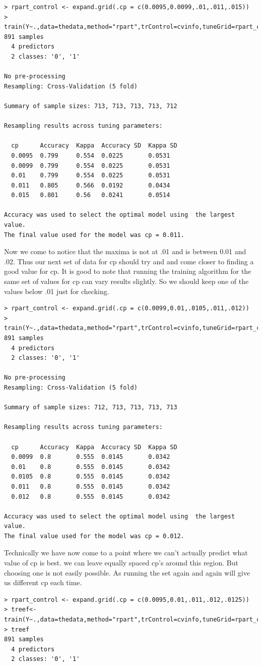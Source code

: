 \documentclass[fontsize=10pt]{scrartcl}
\begin{document}
\begin{enumerate}
\begin{verbatim}
> rpart_control <- expand.grid(.cp = c(0.0095,0.0099,.01,.011,.015)) 
> train(Y~.,data=thedata,method="rpart",trControl=cvinfo,tuneGrid=rpart_control)
891 samples
  4 predictors
  2 classes: '0', '1' 

No pre-processing
Resampling: Cross-Validation (5 fold) 

Summary of sample sizes: 713, 713, 713, 713, 712 

Resampling results across tuning parameters:

  cp      Accuracy  Kappa  Accuracy SD  Kappa SD
  0.0095  0.799     0.554  0.0225       0.0531  
  0.0099  0.799     0.554  0.0225       0.0531  
  0.01    0.799     0.554  0.0225       0.0531  
  0.011   0.805     0.566  0.0192       0.0434  
  0.015   0.801     0.56   0.0241       0.0514  

Accuracy was used to select the optimal model using  the largest value.
The final value used for the model was cp = 0.011. 
\end{verbatim}
				Now we come to notice that the maxima is not at .01 and is between 0.01 and .02. Thus our next set of data for cp should try and and come closer to finding a good value for cp. It is good to note that running the training algorithm for the same set of values for cp can vary results slightly. So we should keep one of the values below .01 just for checking.

\begin{verbatim}
> rpart_control <- expand.grid(.cp = c(0.0099,0.01,.0105,.011,.012)) 
> train(Y~.,data=thedata,method="rpart",trControl=cvinfo,tuneGrid=rpart_control)
891 samples
  4 predictors
  2 classes: '0', '1' 

No pre-processing
Resampling: Cross-Validation (5 fold) 

Summary of sample sizes: 712, 713, 713, 713, 713 

Resampling results across tuning parameters:

  cp      Accuracy  Kappa  Accuracy SD  Kappa SD
  0.0099  0.8       0.555  0.0145       0.0342  
  0.01    0.8       0.555  0.0145       0.0342  
  0.0105  0.8       0.555  0.0145       0.0342  
  0.011   0.8       0.555  0.0145       0.0342  
  0.012   0.8       0.555  0.0145       0.0342  

Accuracy was used to select the optimal model using  the largest value.
The final value used for the model was cp = 0.012. 
\end{verbatim}
				Technically we have now come to a point where we can't actually predict what value of cp is best. we can leave equally spaced cp's around this region. But choosing one is not easily possible. As running the set again and again will give us different cp each time.
\begin{verbatim}
> rpart_control <- expand.grid(.cp = c(0.0095,0.01,.011,.012,.0125)) 
> treef<-train(Y~.,data=thedata,method="rpart",trControl=cvinfo,tuneGrid=rpart_control)
> treef
891 samples
  4 predictors
  2 classes: '0', '1' 


\end{verbatim}
\end{enumerate}
\end{document}
